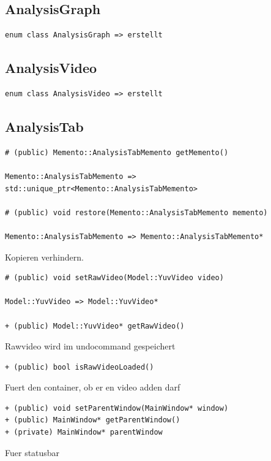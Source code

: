 \documentclass[parskip=full]{scrartcl}
\begin{document}
\subsection{AnalysisGraph}
\begin{verbatim}
enum class AnalysisGraph => erstellt
\end{verbatim}
\subsection{AnalysisVideo}
\begin{verbatim}
enum class AnalysisVideo => erstellt
\end{verbatim}
\subsection{AnalysisTab}
\begin{verbatim}
# (public) Memento::AnalysisTabMemento getMemento()

Memento::AnalysisTabMemento => std::unique_ptr<Memento::AnalysisTabMemento>

# (public) void restore(Memento::AnalysisTabMemento memento)

Memento::AnalysisTabMemento => Memento::AnalysisTabMemento*
\end{verbatim}
Kopieren verhindern.
\begin{verbatim}
# (public) void setRawVideo(Model::YuvVideo video)

Model::YuvVideo => Model::YuvVideo*

+ (public) Model::YuvVideo* getRawVideo()
\end{verbatim}
Rawvideo wird im undocommand gespeichert
\begin{verbatim}
+ (public) bool isRawVideoLoaded()
\end{verbatim}
Fuert den container, ob er en video adden darf
\begin{verbatim}
+ (public) void setParentWindow(MainWindow* window)
+ (public) MainWindow* getParentWindow()
+ (private) MainWindow* parentWindow
\end{verbatim}
Fuer statusbar
\end{document}
